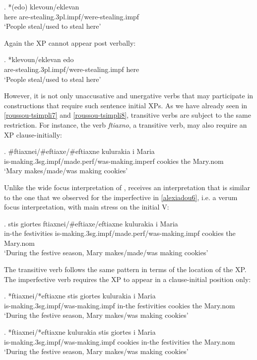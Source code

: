 \documentclass[11pt]{article}
\begin{document}
\exg.
*(edo) klevoun/eklevan\\
here are-stealing.3pl.impf/were-stealing.impf\\ \label{gen1}
`People steal/used to steal here'

Again the XP cannot appear post verbally:

\exg.
*klevoun/eklevan edo\\
 are-stealing.3pl.impf/were-stealing.impf here\\ \label{gen2}
`People steal/used to steal here'

 However, it is not only unaccusative and unergative verbs that may participate in constructions that require such sentence initial XPs. As we have already seen in \ref{roussou-tsimpli7} and \ref{roussou-tsimpli8}, transitive verbs are subject to the same restriction.  For instance, the verb \textit{ftiaxno}, a transitive verb, may also require an XP clause-initially:

\exg. 
\#ftiaxnei/\#eftiaxe/\#eftiaxne kulurakia i Maria\\
is-making.3sg.impf/made.perf/was-making.imperf cookies the Mary.nom\label{evi15}\\
`Mary makes/made/was making cookies'

Unlike the wide focus interpretation of \Next, \Last receives an interpretation that is similar to the one that we observed for the imperfective in \ref{alexiadou6}, i.e. a verum focus interpretation, with main stress on the initial V: 

\exg.
stis giortes ftiaxnei/\#eftiaxe/eftiaxne kulurakia i Maria\\
in-the festivities is-making.3sg.impf/made.perf/was-making.impf cookies the Mary.nom\label{evi14}\\
`During the festive season, Mary makes/made/was making cookies'

The transitive verb follows the same pattern in terms of the location of the XP. The imperfective verb requires the XP to appear in a clause-initial position only:

\exg.
*ftiaxnei/*eftiaxne stis giortes kulurakia i Maria\\
 is-making.3sg.impf/was-making.impf in-the festivities cookies the Mary.nom\label{evi141}\\
`During the festive season, Mary makes/was making cookies'

\exg.
*ftiaxnei/*eftiaxne  kulurakia stis giortes i Maria\\
 is-making.3sg.impf/was-making.impf  cookies in-the festivities the Mary.nom\label{evi142}\\
`During the festive season, Mary makes/was making cookies'
\end{document}
